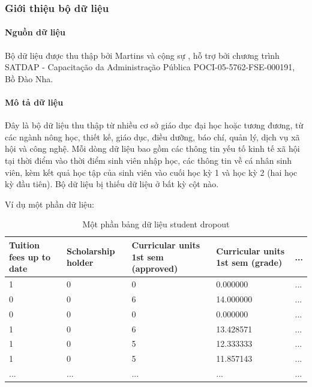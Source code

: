 \subsubsection{Giới thiệu bộ dữ liệu}
    \paragraph{Nguồn dữ liệu}
    \leavevmode
    
    Bộ dữ liệu được thu thập bởi Martins và cộng sự \cite{martins2021early}, hỗ trợ bởi chương trình SATDAP - Capacitação da Administração Pública POCI-05-5762-FSE-000191, Bồ Đào Nha.

    \paragraph{Mô tả dữ liệu}
    \leavevmode
    
    Đây là bộ dữ liệu thu thập từ nhiều cơ sở giáo dục đại học hoặc tương đương, từ các ngành nông học, thiết kế, giáo dục, điều dưỡng, báo chí, quản lý, dịch vụ xã hội và công nghệ. Mỗi dòng dữ liệu bao gồm các thông tin yếu tố kinh tế xã hội tại thời điểm vào thời điểm sinh viên nhập học, các thông tin về cá nhân sinh viên, kèm kết quả học tập của sinh viên vào cuối học kỳ 1 và học kỳ 2 (hai học kỳ đầu tiên). Bộ dữ liệu bị thiếu dữ liệu ở bất kỳ cột nào.

    Ví dụ một phần dữ liệu:

    \begin{table}[htbp]
    \centering
    \caption{Một phần bảng dữ liệu student dropout}
    \label{tab:stat-dropout-exp}
    \begin{tabular}{|p{2cm}|p{2cm}|p{2.5cm}|p{2.5cm}|p{2cm}|}
        \hline
        Tuition fees up to date & Scholarship holder & Curricular units 1st sem (approved) & Curricular units 1st sem (grade) & ... \\
        \midrule
        1 & 0 & 0 & 0.000000 & ...\\
        \hline
        0 & 0 & 6 & 14.000000 & ...\\
        \hline
        0 & 0 & 0 & 0.000000 & ...\\
        \hline
        1 & 0 & 6 & 13.428571 & ...\\
        \hline
        1 & 0 & 5 & 12.333333 & ...\\
        \hline
        1 & 0 & 5 & 11.857143 & ...\\
        \hline
        ... & ... & ... & ... & ...\\
        \hline
    \end{tabular}
    \end{table}

